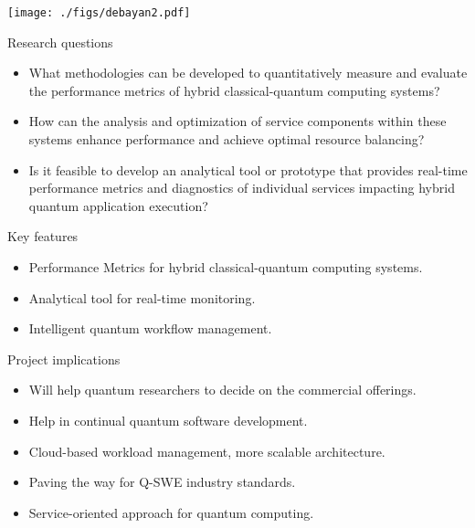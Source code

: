\documentclass[landscape,a0,final]{a0poster} %
\begin{document}
\begin{minipage}{0.98\linewidth}
\begin{minipage}[t]{0.3\linewidth}
\begin{center}

\texttt{[image: ./figs/debayan2.pdf]}
\end{center}

\begin{myframe}{Research questions}
    \begin{itemize}
    \item What methodologies can be developed to quantitatively measure and evaluate the performance metrics of hybrid classical-quantum computing systems?
    \item How can the analysis and optimization of service components within these systems enhance performance and achieve optimal resource balancing?
    \item Is it feasible to develop an analytical tool or prototype that provides real-time performance metrics and diagnostics of individual services impacting hybrid quantum application execution?
    \end{itemize}
 
\end{myframe}

\begin{myframe}{Key features}
    \begin{itemize}
        \item Performance Metrics for hybrid classical-quantum computing systems.
        \item Analytical tool for real-time monitoring.
        \item Intelligent quantum workflow management.
    \end{itemize}


\end{myframe}

\begin{myframe}{Project implications}
    \begin{itemize}
        \item Will help quantum researchers to decide on the commercial offerings.
        \item Help in continual quantum software development.
        \item Cloud-based workload management, more scalable architecture.
        \item Paving the way for Q-SWE industry standards.
        \item Service-oriented approach for quantum computing.
        
    \end{itemize}



\end{myframe}
\end{minipage}
\end{minipage}
\end{document}
